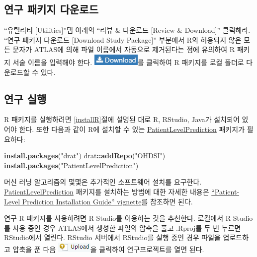 \documentclass[11pt]{book}
\newenvironment{Shaded}{\begin{snugshade}}{\end{snugshade}}
\newcommand{\KeywordTok}[1]{\textcolor[rgb]{0.13,0.29,0.53}{\textbf{#1}}}
\newcommand{\StringTok}[1]{\textcolor[rgb]{0.31,0.60,0.02}{#1}}
\newcommand{\OperatorTok}[1]{\textcolor[rgb]{0.81,0.36,0.00}{\textbf{#1}}}
\newcommand{\NormalTok}[1]{#1}
\theoremstyle{definition}
\theoremstyle{definition}
\theoremstyle{definition}
\theoremstyle{remark}
\begin{document}
\subsection{연구 패키지 다운로드}\label{--}

``유틸리티 {[}Utilities{]}''탭 아래의 ``리뷰 \& 다운로드 {[}Review \&
Download{]}'' 클릭해라. ``연구 패키지 다운로드 {[}Download Study
Package{]}'' 부분에서 R의 허용되지 않은 모든 문자가 ATLAS에 의해 파일
이름에서 자동으로 제거된다는 점에 유의하여 R 패키지 서술 이름을 입력해야
한다. \includegraphics{images/PatientLevelPrediction/download.png}를
클릭하여 R 패키지를 로컬 폴더로 다운로드할 수 있다.

\subsection{연구 실행}\label{-}

R 패키지를 실행하려면 \ref{installR}절에 설명된 대로 R, RStudio, Java가
설치되어 있어야 한다. 또한 다음과 같이 R에 설치할 수 있는
\href{https://ohdsi.github.io/PatientLevelPrediction/}{PatientLevelPrediction}
패키지가 필요하다:

\begin{Shaded}
\begin{Highlighting}[]
\KeywordTok{install.packages}\NormalTok{(}\StringTok{"drat"}\NormalTok{)}
\NormalTok{drat}\OperatorTok{::}\KeywordTok{addRepo}\NormalTok{(}\StringTok{"OHDSI"}\NormalTok{)}
\KeywordTok{install.packages}\NormalTok{(}\StringTok{"PatientLevelPrediction"}\NormalTok{)}
\end{Highlighting}
\end{Shaded}

머신 러닝 알고리즘의 몇몇은 추가적인 소프트웨어 설치를 요구한다.
\href{https://ohdsi.github.io/PatientLevelPrediction/}{PatientLevelPrediction}
패키지를 설치하는 방법에 대한 자세한 내용은
\href{https://ohdsi.github.io/PatientLevelPrediction/articles/InstallationGuide.html}{``Patient-Level
Prediction Installation Guide'' vignette}를 참조하면 된다.

연구 R 패키지를 사용하려면 R Studio를 이용하는 것을 추천한다. 로컬에서 R
Studio를 사용 중인 경우 ATLAS에서 생성한 파일의 압축을 풀고 .Rproj를 두
번 누르면 RStudio에서 열린다. RStudio 서버에서 RStudio를 실행 중인 경우
파일을 업로드하고 압축을 푼 다음
\includegraphics{images/PopulationLevelEstimation/upload.png}을 클릭하여
연구프로젝트를 열면 된다.
\end{document}

